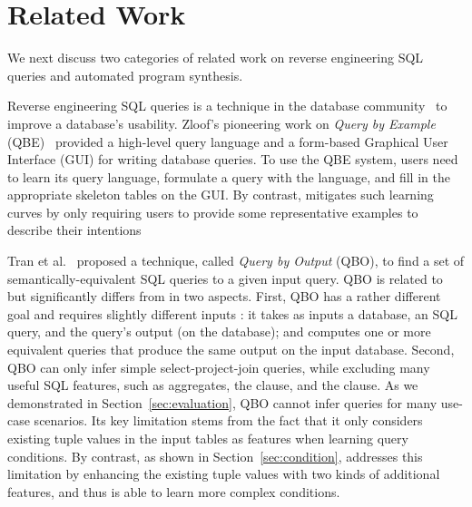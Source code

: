 
\section{Related Work}
\label{sec:related}

We next discuss two categories
of related work on reverse engineering SQL queries 
and automated program synthesis.



\vspace{1mm}
Reverse engineering SQL queries is a technique in the database
community~\cite{Zloof:1975, Tran:2009, DasSarma:2010} to
improve a database's usability. 
Zloof's pioneering work on \textit{Query by Example} (QBE)~\cite{Zloof:1975}
provided a high-level query language and a
form-based Graphical User Interface (GUI) for
writing database queries. To use the QBE system, 
users need to learn its query language,
formulate a query with the language, and fill in
the appropriate skeleton tables on the GUI.
By contrast, \ourtool mitigates such learning curves
by only requiring users to provide some representative
examples to describe their intentions




Tran et al.~\cite{Tran:2009} proposed a technique,
called \textit{Query by Output} (QBO), 
to find a set of semantically-equivalent SQL queries
to a given input query. QBO is related to but
significantly differs from \ourtool in two aspects.
First, QBO has a rather different goal and requires
slightly different inputs : it takes as inputs a database,
an SQL query, and the query's output (on the database); and computes
one or more equivalent queries that produce the
same output on the input database.
Second, QBO can only infer simple select-project-join queries,
while excluding many useful SQL features, such as aggregates,
the  clause, and the 
clause. As we demonstrated in Section~\ref{sec:evaluation},
QBO cannot infer queries for many use-case scenarios.
Its key limitation stems from the fact that it
only considers existing tuple values
in the input tables as features when learning
query conditions. 
By contrast, as shown in Section~\ref{sec:condition},
\ourtool addresses this limitation by enhancing
the existing tuple values with two kinds of
additional features, and thus is able to learn more
complex conditions.


